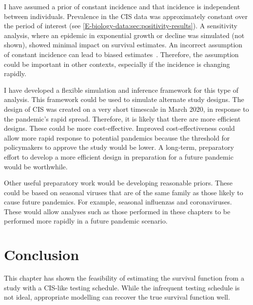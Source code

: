 \documentclass[thesis.tex]{subfiles}
\begin{document}
I have assumed a prior of constant incidence and that incidence is independent between individuals.
Prevalence in the CIS data was approximately constant over the period of interest (see \cref{E-biology-data:sec:positivity-results}).
A sensitivity analysis, where an epidemic in exponential growth or decline was simulated (not shown), showed minimal impact on survival estimates.
An incorrect assumption of constant incidence can lead to biased estimates~\autocite{degruttolaAnalysis}.
Therefore, the assumption could be important in other contexts, especially if the incidence is changing rapidly.

I have developed a flexible simulation and inference framework for this type of analysis.
This framework could be used to simulate alternate study designs.
The design of CIS was created on a very short timescale in March 2020, in response to the pandemic's rapid spread.
Therefore, it is likely that there are more efficient designs.
These could be more cost-effective.
Improved cost-effectiveness could allow more rapid response to potential pandemics because the threshold for policymakers to approve the study would be lower.
A long-term, preparatory effort to develop a more efficient design in preparation for a future pandemic would be worthwhile.

Other useful preparatory work would be developing reasonable priors.
These could be based on seasonal viruses that are of the same family as those likely to cause future pandemics.
For example, seasonal influenzas and coronaviruses.
These would allow analyses such as those performed in these chapters to be performed more rapidly in a future pandemic scenario.

\section{Conclusion} \label{perf-test:sec:conclusion}
This chapter has shown the feasibility of estimating the survival function from a study with a CIS-like testing schedule.
While the infrequent testing schedule is not ideal, appropriate modelling can recover the true survival function well.


\ifSubfilesClassLoaded{
  \appendix
  
  \listoftodos
}{}
\end{document}
